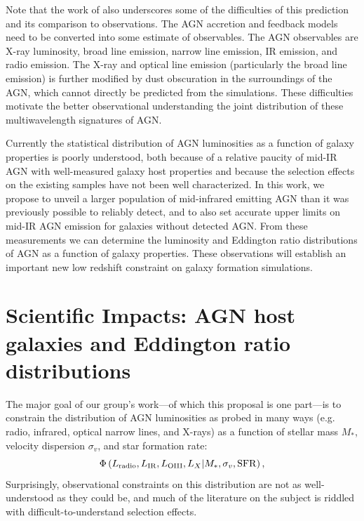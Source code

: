 \documentclass[12pt, preprint]{hacked-aastex}
\begin{document}
Note that the work of \cite{habouzit22a} also underscores some of the
difficulties of this prediction and its comparison to observations.
The AGN accretion and feedback models need to be converted into some
estimate of observables. The AGN observables are X-ray luminosity,
broad line emission, narrow line emission, IR emission, and radio
emission. The X-ray and optical line emission (particularly the broad
line emission) is further modified by dust obscuration in the
surroundings of the AGN, which cannot directly be predicted from the
simulations. These difficulties motivate the better observational
understanding the joint distribution of these multiwavelength
signatures of AGN.

Currently the statistical distribution of AGN luminosities as a
function of galaxy properties is poorly understood, both because of a
relative paucity of mid-IR AGN with well-measured galaxy host
properties and because the selection effects on the existing samples
have not been well characterized.  In this work, we propose to unveil
a larger population of mid-infrared emitting AGN than it was
previously possible to reliably detect, and to also set accurate upper
limits on mid-IR AGN emission for galaxies without detected AGN. From
these measurements we can determine the luminosity and Eddington ratio
distributions of AGN as a function of galaxy properties.  These
observations will establish an important new low redshift constraint
on galaxy formation simulations.

\section{Scientific Impacts: AGN host galaxies and Eddington ratio distributions}\label{sec:intro}

The major goal of our group's work---of which this proposal is one
part---is to constrain the distribution of AGN luminosities as probed
in many ways (e.g. radio, infrared, optical narrow lines, and X-rays)
as a function of stellar mass $M_\ast$, velocity dispersion
$\sigma_v$, and star formation rate:
\begin{equation}
\label{eq:model}
\Phi\left(L_{\rm radio}, L_{\rm IR}, L_{\rm OIII}, L_X | M_\ast, \sigma_v, {\rm SFR}\right),
\end{equation}
Surprisingly, observational constraints on this distribution are not
as well-understood as they could be, and much of the literature on the
subject is riddled with difficult-to-understand selection effects.
\end{document}
